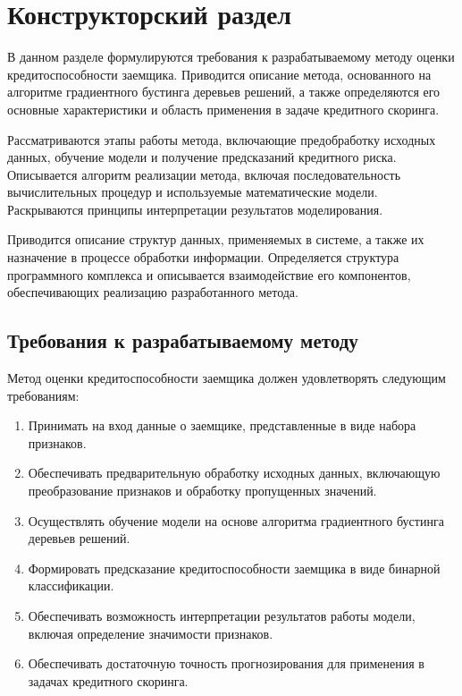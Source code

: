 \section{Конструкторский раздел}
В данном разделе формулируются требования к разрабатываемому методу оценки кредитоспособности заемщика. Приводится описание метода, основанного на алгоритме градиентного бустинга деревьев решений, а также определяются его основные характеристики и область применения в задаче кредитного скоринга.

Рассматриваются этапы работы метода, включающие предобработку исходных данных, обучение модели и получение предсказаний кредитного риска. Описывается алгоритм реализации метода, включая последовательность вычислительных процедур и используемые математические модели. Раскрываются принципы интерпретации результатов моделирования.

Приводится описание структур данных, применяемых в системе, а также их назначение в процессе обработки информации. Определяется структура программного комплекса и описывается взаимодействие его компонентов, обеспечивающих реализацию разработанного метода.

\subsection{Требования к разрабатываемому методу}

Метод оценки кредитоспособности заемщика должен удовлетворять следующим требованиям:

\begin{enumerate}
  \item Принимать на вход данные о заемщике, представленные в виде набора признаков.
  \item Обеспечивать предварительную обработку исходных данных, включающую преобразование признаков и обработку пропущенных значений.
  \item Осуществлять обучение модели на основе алгоритма градиентного бустинга деревьев решений.
  \item Формировать предсказание кредитоспособности заемщика в виде бинарной классификации.
  \item Обеспечивать возможность интерпретации результатов работы модели, включая определение значимости признаков.
  \item Обеспечивать достаточную точность прогнозирования для применения в задачах кредитного скоринга.
\end{enumerate}


